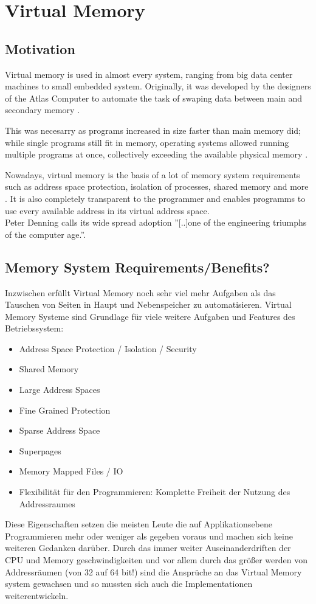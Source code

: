 \section{Virtual Memory}
\subsection{Motivation}
Virtual memory is used in almost every system, ranging from big data center machines to small embedded system.
Originally, it was developed by the designers of the Atlas Computer to automate the task of swaping data between
main and secondary memory \cite{denning1997before}.

This was necesarry as programs increased in size faster than main memory did; while single programs
still fit in memory, operating systems allowed running multiple programs at once, collectively exceeding
the available physical memory \cite{tanenbaumOS}.

Nowadays, virtual memory is the basis of a lot of memory system requirements such as address
space protection, isolation of processes, shared memory and more \cite{jacobSoftwaremanagedAddressTranslation1997}.
It is also completely transparent to the programmer and enables programms to use every available
address in its virtual address space\cite{jacob1998look}.\\

Peter Denning calls its wide spread adoption ''[..]one of the engineering triumphs of the computer
age.''\cite{denning1997before}.
\subsection{Memory System Requirements/Benefits?}
Inzwischen erfüllt Virtual Memory noch sehr viel mehr Aufgaben als das Tauschen von Seiten in
Haupt und Nebenspeicher zu automatisieren. Virtual Memory Systeme sind Grundlage für
viele weitere Aufgaben und Features des Betriebssystem\cite{jacobSoftwaremanagedAddressTranslation1997}:
\begin{itemize}
    \item Address Space Protection / Isolation / Security
    \item Shared Memory
    \item Large Address Spaces
    \item Fine Grained Protection
    \item Sparse Address Space
    \item Superpages
    \item Memory Mapped Files / IO \cite{tanenbaumOS}
    \item Flexibilität für den Programmieren: Komplette Freiheit der Nutzung des Addressraumes
\end{itemize}
Diese Eigenschaften setzen die meisten Leute die auf Applikationsebene Programmieren mehr oder
weniger als gegeben voraus und machen sich keine weiteren Gedanken darüber.
Durch das immer weiter Auseinanderdriften der CPU und Memory geschwindigkeiten und vor allem
durch das größer werden von Addressräumen (von 32 auf 64 bit!)  sind die Ansprüche an
das Virtual Memory system gewachsen und so mussten sich auch die Implementationen weiterentwickeln.

